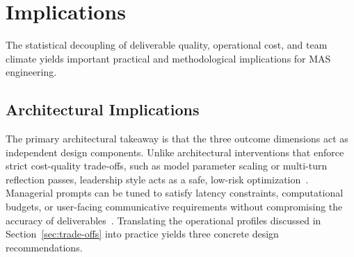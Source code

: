 \section{Implications}
\label{sec:implications}

The statistical decoupling of deliverable quality, operational cost, and team climate yields important practical and methodological implications for \ac{MAS} engineering.

\subsection{Architectural Implications}

The primary architectural takeaway is that the three outcome dimensions act as independent design components.
Unlike architectural interventions that enforce strict cost-quality trade-offs, such as model parameter scaling or multi-turn reflection passes, leadership style acts as a safe, low-risk optimization~\cite{zhang2024cutcrapeconomicalcommunication, chen2023agentversefacilitatingmultiagentcollaboration}.
Managerial prompts can be tuned to satisfy latency constraints, computational budgets, or user-facing communicative requirements without compromising the accuracy of deliverables~\cite{wu2023autogenenablingnextgenllm, hong2024metagptmetaprogrammingmultiagent}.
Translating the operational profiles discussed in Section~\ref{sec:trade-offs} into practice yields three concrete design recommendations.

